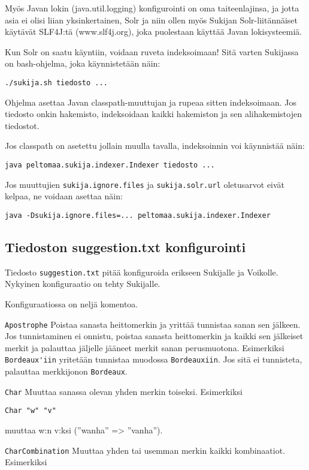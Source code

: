 \documentclass[12pt,a4paper]{scrartcl}
\begin{document}
Myös Javan lokin (java.util.logging) konfigurointi on oma
taiteenlajinsa, ja jotta asia ei olisi liian yksinkertainen, Solr ja
niin ollen myös Sukijan Solr-liitännäiset käytävät SLF4J:tä
(www.slf4j.org), joka puolestaan käyttää Javan lokisysteemiä.

\bigskip
Kun Solr on saatu käyntiin, voidaan ruveta indeksoimaan! Sitä varten
Sukijassa on bash-ohjelma, joka käynnistetään näin:

\verb|./sukija.sh tiedosto ...|

Ohjelma asettaa Javan classpath-muuttujan ja rupeaa sitten
indeksoimaan. Jos tiedosto onkin hakemisto, indeksoidaan kaikki
hakemiston ja sen alihakemistojen tiedostot.

Jos classpath on asetettu jollain muulla tavalla, indeksoinnin voi
käynnistää näin:

\verb|java peltomaa.sukija.indexer.Indexer tiedosto ...|

Jos muuttujien \verb|sukija.ignore.files| ja \verb|sukija.solr.url|
oletusarvot eivät kelpaa, ne voidaan asettaa näin:

\verb|java -Dsukija.ignore.files=... peltomaa.sukija.indexer.Indexer|


\subsection*{Tiedoston suggestion.txt konfigurointi}

Tiedosto \verb|suggestion.txt| pitää konfiguroida erikseen Sukijalle
ja Voikolle. Nykyinen konfiguraatio on tehty Sukijalle.

Konfiguraatiossa on neljä komentoa.

\bigskip
\verb|Apostrophe| Poistaa sanasta heittomerkin ja yrittää tunnistaa
sanan sen jälkeen. Jos tunnistaminen ei onnistu, poistaa sanasta
heittomerkin ja kaikki sen jälkeiset merkit ja palauttaa jäljelle
jääneet merkit sanan perusmuotona. Esimerkiksi \verb|Bordeaux'iin|
yritetään tunnistaa muodossa \verb|Bordeauxiin|. Jos sitä ei
tunnisteta, palauttaa merkkijonon \verb|Bordeaux|.

\bigskip
\verb|Char| Muuttaa sanassa olevan yhden merkin toiseksi. Esimerkiksi

\verb|Char "w" "v"|

muuttaa w:n v:ksi (''wanha'' => ''vanha'').

\bigskip
\verb|CharCombination| Muuttaa yhden tai usemman merkin kaikki
kombinaatiot. Esimerkiksi
\end{document}

